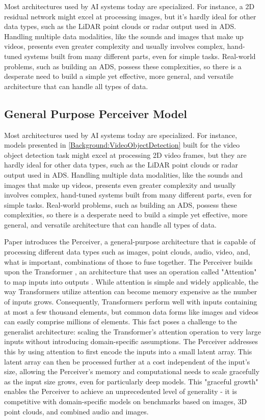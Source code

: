 Most architectures used by AI systems today are specialized. For instance, a 2D residual network might excel at processing images, but it's hardly ideal for other data types, such as the LiDAR point clouds or radar output used in ADS. Handling multiple data modalities, like the sounds and images that make up videos, presents even greater complexity and usually involves complex, hand-tuned systems built from many different parts, even for simple tasks. Real-world problems, such as building an ADS, possess these complexities, so there is a desperate need to build a simple yet effective, more general, and versatile architecture that can handle all types of data.


\subsection{General Purpose Perceiver Model} \label{Background:Perceiver}

Most architectures used by AI systems today are specialized. For instance, models presented in \ref{Background:VideoObjectDetection} built for the video object detection task might excel at processing 2D video frames, but they are hardly ideal for other data types, such as the LiDAR point clouds or radar output used in ADS. Handling multiple data modalities, like the sounds and images that make up videos, presents even greater complexity and usually involves complex, hand-tuned systems built from many different parts, even for simple tasks. Real-world problems, such as building an ADS, possess these complexities, so there is a desperate need to build a simple yet effective, more general, and versatile architecture that can handle all types of data.

Paper \cite{jaeglePerceiverGeneralPerception2021} introduces the Perceiver, a general-purpose architecture that is capable of processing different data types such as images, point clouds, audio, video, and, what is important, combinations of those to fuse together. The Perceiver builds upon the Transformer \cite{}, an architecture that uses an operation called "Attention" to map inputs into outputs \cite{}. While attention is simple and widely applicable, the way Transformers utilize attention can become memory expensive as the number of inputs grows. Consequently, Transformers perform well with inputs containing at most a few thousand elements, but common data forms like images and videos can easily comprise millions of elements. This fact poses a challenge to the generalist architecture: scaling the Transformer's attention operation to very large inputs without introducing domain-specific assumptions. The Perceiver addresses this by using attention to first encode the inputs into a small latent array. This latent array can then be processed further at a cost independent of the input's size, allowing the Perceiver's memory and computational needs to scale gracefully as the input size grows, even for particularly deep models. This "graceful growth" enables the Perceiver to achieve an unprecedented level of generality - it is competitive with domain-specific models on benchmarks based on images, 3D point clouds, and combined audio and images.

